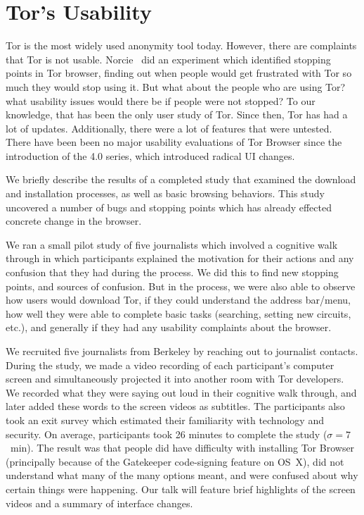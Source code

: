 \documentclass{template}
\begin{document}
\section{Tor's Usability}
{\color {red}

Tor is the most widely used anonymity tool today. However, there are complaints that Tor is not usable. Norcie~\cite{norcie2012eliminating} did an experiment which identified stopping points in Tor browser, 
finding out when people would get frustrated with Tor so much they would stop using it. 
But what about the people who are using Tor? what usability issues would there be if people were not stopped? 
To our knowledge, that has been the only user study of Tor. 
Since then, Tor has had a lot of updates. 
Additionally, there were a lot of features that were untested. 
There have been been no major usability evaluations of
Tor Browser since the introduction of the 4.0 series,
which introduced radical UI changes.

We briefly describe the results of a completed study
that examined the download and installation processes, 
as well as basic browsing behaviors.
This study uncovered a number of bugs and stopping points
which has already effected concrete change in the browser.

We ran a small pilot study of five journalists which involved a cognitive walk through in which 
participants explained the motivation for their actions and any confusion that they had during the process. 
We did this to find new stopping points, and sources of confusion. 
But in the process, we were also able to observe how users would download Tor, 
if they could understand the address bar/menu, how well they were able to complete basic tasks
(searching, setting new circuits, etc.), and generally if they had any usability complaints about the browser. 

We recruited five journalists from Berkeley by reaching out to journalist contacts. 
During the study, we made a video recording of each participant's computer screen
and simultaneously projected it
into another room with Tor developers.
We recorded what they were saying out loud in their cognitive walk through,
and later added these words to the screen videos as subtitles.
The participants also took an exit survey which estimated their familiarity with technology and security. On average, participants took 26 minutes to complete the study ($\sigma = 7$~min).  The result was that people did have difficulty with installing Tor Browser (principally because of the Gatekeeper code-signing feature on OS~X), did not understand what many of the many options meant, and were confused about why certain things were happening. 
Our talk will feature brief highlights of the screen videos and a summary of interface changes.

}
\end{document}
